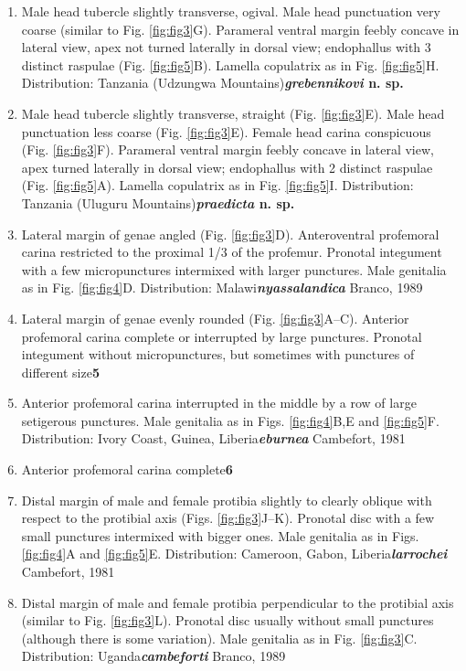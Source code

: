 \documentclass[fleqn,10pt,lineno]{wlpeerj}
\begin{document}
\begin{enumerate}
\item [--] Male head tubercle slightly transverse, ogival. Male head punctuation very coarse (similar to Fig. \ref{fig:fig3}G). Parameral ventral margin feebly concave in lateral view, apex not turned laterally in dorsal view; endophallus with 3 distinct raspulae (Fig. \ref{fig:fig5}B). Lamella copulatrix as in Fig. \ref{fig:fig5}H. Distribution: Tanzania (Udzungwa Mountains)\dotfill\textbf{\textit{grebennikovi} n. sp.}
\item [--] Male head tubercle slightly transverse, straight (Fig. \ref{fig:fig3}E). Male head punctuation less coarse (Fig. \ref{fig:fig3}E). Female head carina conspicuous (Fig. \ref{fig:fig3}F). Parameral ventral margin feebly concave in lateral view, apex turned laterally in dorsal view; endophallus with 2 distinct raspulae (Fig. \ref{fig:fig5}A). Lamella copulatrix as in Fig. \ref{fig:fig5}I. Distribution: Tanzania (Uluguru Mountains)\dotfill\textbf{\textit{praedicta} n. sp.}
\item [4.] Lateral margin of genae angled (Fig. \ref{fig:fig3}D). Anteroventral profemoral carina restricted to the proximal 1/3 of the profemur. Pronotal integument with a few micropunctures intermixed with larger punctures. Male genitalia as in Fig. \ref{fig:fig4}D. Distribution: Malawi\dotfill\textbf{\textit{nyassalandica}} Branco, 1989
\item[--] Lateral margin of genae evenly rounded (Fig. \ref{fig:fig3}A--C). Anterior profemoral carina complete or interrupted by large punctures. Pronotal integument without micropunctures, but sometimes with punctures of different size\dotfill\textbf{5}
\item[5.] Anterior profemoral carina interrupted in the middle by a row of large setigerous punctures. Male genitalia as in Figs. \ref{fig:fig4}B,E and \ref{fig:fig5}F. Distribution: Ivory Coast, Guinea, Liberia\dotfill\textbf{\textit{eburnea}} Cambefort, 1981
\item[--] Anterior profemoral carina complete\dotfill\textbf{6}
\item[6.] Distal margin of male and female protibia slightly to clearly oblique with respect to the protibial axis (Figs. \ref{fig:fig3}J--K). Pronotal disc with a few small punctures intermixed with bigger ones. Male genitalia as in Figs. \ref{fig:fig4}A and \ref{fig:fig5}E. Distribution: Cameroon, Gabon, Liberia\dotfill\textbf{\textit{larrochei}} Cambefort, 1981
\item[--] Distal margin of male and female protibia perpendicular to the protibial axis (similar to Fig. \ref{fig:fig3}L). Pronotal disc usually without small punctures (although there is some variation). Male genitalia as in Fig. \ref{fig:fig3}C. Distribution: Uganda\dotfill\textbf{\textit{cambeforti}} Branco, 1989
\end{enumerate}
\end{document}
